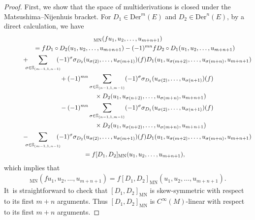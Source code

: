 \documentclass[pdftex]{sigma}%
\numberwithin{equation}{section}
\newcommand{\CWM}{C^{\infty}(M)}
\newcommand{\Der}{\mathrm{Der}}
\newcommand{\MN}{\mathrm{MN}}
\begin{document}
\begin{proof}
First, we show that the space of multiderivations is closed under the Matsushima--Nijenhuis bracket. For $D_1\in \Der^m(E)$ and $D_2\in \Der^n(E)$, by a direct calculation, we have
\begin{gather*}
[D_1,D_2]_{\MN}(fu_1,u_2,\dots,u_{m+n+1})
\\ \qquad
{}=fD_1\circ D_2(u_1,u_2,\dots,u_{m+n+1})-(-1)^{mn}fD_2\circ D_1(u_1,u_2,\dots,u_{m+n+1})
\\ \qquad\hphantom{=}
{}+\!\!\!\!\sum_{\sigma\in \mathbb{S}_{(m-1,1,n-1)}}\!\!\!\!(-1)^{\sigma}\sigma_{D_2} (u_{\sigma(2)},\dots,u_{\sigma(m+1)})(f)D_1(u_1,u_{\sigma(m+2)},\dots,u_{\sigma(m+n)},u_{m+n+1})
\\ \qquad\hphantom{=}
{}+(-1)^{mn}\sum_{\sigma\in \mathbb{S}_{(n-1,1,m-1)}}(-1)^{\sigma}\sigma_{D_1} (u_{\sigma(2)},\dots,u_{\sigma(n+1)})(f)
\\ \qquad\hphantom{=+(-1)^{mn}}
{}\times D_2(u_1,u_{\sigma(n+2)},\dots,u_{\sigma(m+n)},u_{m+n+1})
\\ \qquad\hphantom{=}
{}-(-1)^{mn}\sum_{\sigma\in \mathbb{S}_{(n-1,1,m-1)}}(-1)^{\sigma}\sigma_{D_1} (u_{\sigma(2)},\dots,u_{\sigma(n+1)})(f)
\\ \qquad\hphantom{=+(-1)^{mn}}
{}\times D_2(u_1,u_{\sigma(n+2)},\dots,u_{\sigma(m+n)},u_{m+n+1})
\\ \qquad\hphantom{=}
{}-\!\!\!\!\sum_{\sigma\in \mathbb{S}_{(m-1,1,n-1)}}\!\!\!\!(-1)^{\sigma}\sigma_{D_2} (u_{\sigma(2)},\dots,u_{\sigma(m+1)})(f)D_1(u_1,u_{\sigma(m+2)},\dots,u_{\sigma(m+n)},u_{m+n+1})
\\ \qquad
{}=f[D_1,D_2]_{\MN}(u_1,u_2,\dots,u_{m+n+1}),
\end{gather*}
which implies that
\begin{gather*}
[D_1,D_2]_{\MN}(fu_1,u_2,\dots,u_{m+n+1})=f[D_1,D_2]_{\MN}(u_1,u_2,\dots,u_{m+n+1}).
\end{gather*}
It~is straightforward to check that $[D_1,D_2]_{\MN}$ is skew-symmetric with respect to its first $m+n$ arguments. Thus $[D_1,D_2]_{\MN}$ is $\CWM$-linear with respect to its first $m+n$ arguments.


\end{proof}
\end{document}
